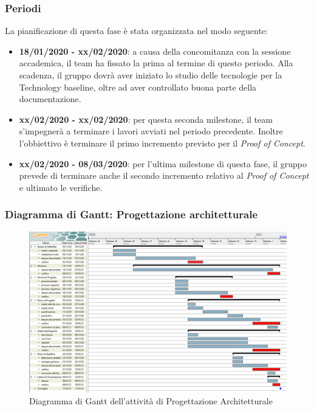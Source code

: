\subsubsection{Periodi}
La pianificazione di questa fase è stata organizzata nel modo seguente:
\begin{itemize}
\item \textbf{18/01/2020 - xx/02/2020}: a causa della concomitanza con la sessione accademica, il team ha fissato la prima  al termine di questo periodo. Alla scadenza, il gruppo dovrà aver iniziato lo studio delle tecnologie per la Technology baseline, oltre ad aver controllato buona parte della documentazione.

\item \textbf{xx/02/2020 - xx/02/2020}: per questa seconda milestone, il team s'impegnerà a terminare i lavori avviati nel periodo precedente. Inoltre l'obbiettivo è terminare il primo incremento previsto per il \textit{Proof of Concept}.

\item \textbf{xx/02/2020 - 08/03/2020}: per l'ultima milestone di questa fase, il gruppo prevede di terminare anche il secondo incremento relativo al \textit{Proof of Concept} e ultimato le verifiche.
\end{itemize}

\subsubsection{Diagramma di Gantt: Progettazione architetturale}
\begin{figure}[h]
	\includegraphics[scale=0.45]{Images/GanttPianificazioneAnalisi.PNG}
	\caption{Diagramma di Gantt dell'attività di Progettazione Architetturale}
\end{figure}